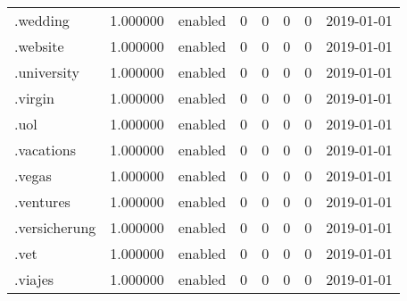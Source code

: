 \begin{tabular}{lrlrrrrl}
.wedding                  &          1.000000 &         enabled &                           0 &                           0 &                           0 &                   0 &           2019-01-01 \\
.website                  &          1.000000 &         enabled &                           0 &                           0 &                           0 &                   0 &           2019-01-01 \\
.university               &          1.000000 &         enabled &                           0 &                           0 &                           0 &                   0 &           2019-01-01 \\
.virgin                   &          1.000000 &         enabled &                           0 &                           0 &                           0 &                   0 &           2019-01-01 \\
.uol                      &          1.000000 &         enabled &                           0 &                           0 &                           0 &                   0 &           2019-01-01 \\
.vacations                &          1.000000 &         enabled &                           0 &                           0 &                           0 &                   0 &           2019-01-01 \\
.vegas                    &          1.000000 &         enabled &                           0 &                           0 &                           0 &                   0 &           2019-01-01 \\
.ventures                 &          1.000000 &         enabled &                           0 &                           0 &                           0 &                   0 &           2019-01-01 \\
.versicherung             &          1.000000 &         enabled &                           0 &                           0 &                           0 &                   0 &           2019-01-01 \\
.vet                      &          1.000000 &         enabled &                           0 &                           0 &                           0 &                   0 &           2019-01-01 \\
.viajes                   &          1.000000 &         enabled &                           0 &                           0 &                           0 &                   0 &           2019-01-01 \\

\end{tabular}
